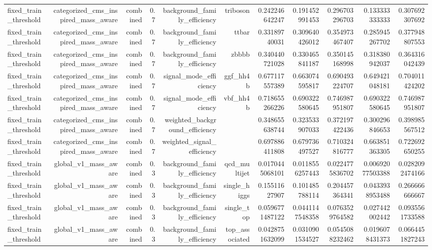 \begin{table}[htbp]
{\begin{tabular}{lrrrrrrrrrr}
fixed\_train\_threshold & categorized\_cms\_inspired\_mass\_aware & combined & 0.7 & background\_family\_efficiency & triboson & 0.242246642247 & 0.191452991453 & 0.296703296703 & 0.133333333333 & 0.307692307692 \\
fixed\_train\_threshold & categorized\_cms\_inspired\_mass\_aware & combined & 0.7 & background\_family\_efficiency & ttbar & 0.33189740031 & 0.309640426012 & 0.354973467407 & 0.285945267702 & 0.377948807553 \\
fixed\_train\_threshold & categorized\_cms\_inspired\_mass\_aware & combined & 0.7 & background\_family\_efficiency & zbbbb & 0.340440721028 & 0.330465841187 & 0.350145168998 & 0.318380942037 & 0.364316042439 \\
fixed\_train\_threshold & categorized\_cms\_inspired\_mass\_aware & combined & 0.7 & signal\_mode\_efficiency & ggf\_hh4b & 0.677117557389 & 0.663074595817 & 0.690493224707 & 0.649421048181 & 0.704011424202 \\
fixed\_train\_threshold & categorized\_cms\_inspired\_mass\_aware & combined & 0.7 & signal\_mode\_efficiency & vbf\_hh4b & 0.718655266226 & 0.690322580645 & 0.746987951807 & 0.690322580645 & 0.746987951807 \\
fixed\_train\_threshold & categorized\_cms\_inspired\_mass\_aware & combined & 0.7 & weighted\_background\_efficiency &  & 0.348655638744 & 0.323533907033 & 0.372197422436 & 0.300296846653 & 0.398985567512 \\
fixed\_train\_threshold & categorized\_cms\_inspired\_mass\_aware & combined & 0.7 & weighted\_signal\_efficiency &  & 0.697886411808 & 0.679736497527 & 0.710324816777 & 0.663851363305 & 0.722692650255 \\
fixed\_train\_threshold & global\_v1\_mass\_aware & combined & 0.3 & background\_family\_efficiency & qcd\_multijet & 0.0170445068101 & 0.0118556257443 & 0.0224775836702 & 0.00692077503388 & 0.0282092474166 \\
fixed\_train\_threshold & global\_v1\_mass\_aware & combined & 0.3 & background\_family\_efficiency & single\_higgs & 0.15511627907 & 0.101485788114 & 0.204457364341 & 0.0433938953488 & 0.266666666667 \\
fixed\_train\_threshold & global\_v1\_mass\_aware & combined & 0.3 & background\_family\_efficiency & single\_top & 0.0596771487122 & 0.0441147548358 & 0.0763529764582 & 0.027442002442 & 0.0935561733588 \\
fixed\_train\_threshold & global\_v1\_mass\_aware & combined & 0.3 & background\_family\_efficiency & top\_associated & 0.0428751632099 & 0.0310901534527 & 0.0545088232462 & 0.0196078431373 & 0.0664451827243 \\

\end{tabular}}
\end{table}
